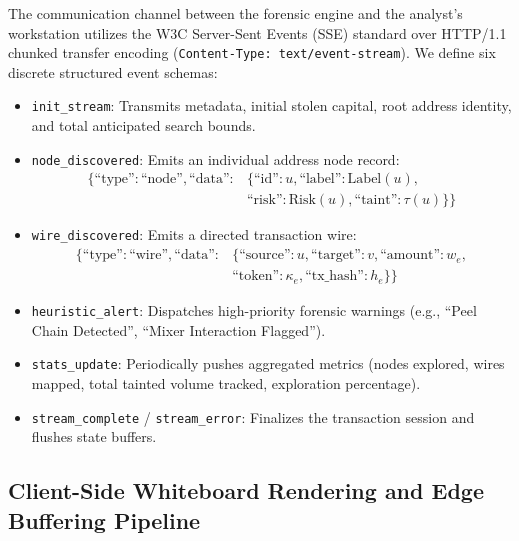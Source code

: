 The communication channel between the forensic engine and the analyst's workstation utilizes the W3C Server-Sent Events (SSE) standard over HTTP/1.1 chunked transfer encoding (\texttt{Content-Type: text/event-stream}). We define six discrete structured event schemas:

\begin{itemize}
    \item \texttt{init\_stream}: Transmits metadata, initial stolen capital, root address identity, and total anticipated search bounds.
    \item \texttt{node\_discovered}: Emits an individual address node record:
    \begin{equation}
    \begin{split}
        \{\text{``type''}: \text{``node''}, \text{``data''}: &\{\text{``id''}: u, \text{``label''}: \text{Label}(u), \\
        &\text{``risk''}: \text{Risk}(u), \text{``taint''}: \tau(u)\}\}
    \end{split}
    \end{equation}
    \item \texttt{wire\_discovered}: Emits a directed transaction wire:
    \begin{equation}
    \begin{split}
        \{\text{``type''}: \text{``wire''}, \text{``data''}: &\{\text{``source''}: u, \text{``target''}: v, \text{``amount''}: w_e, \\
        &\text{``token''}: \kappa_e, \text{``tx\_hash''}: h_e\}\}
    \end{split}
    \end{equation}
    \item \texttt{heuristic\_alert}: Dispatches high-priority forensic warnings (e.g., ``Peel Chain Detected'', ``Mixer Interaction Flagged'').
    \item \texttt{stats\_update}: Periodically pushes aggregated metrics (nodes explored, wires mapped, total tainted volume tracked, exploration percentage).
    \item \texttt{stream\_complete} / \texttt{stream\_error}: Finalizes the transaction session and flushes state buffers.
\end{itemize}

\subsection{Client-Side Whiteboard Rendering and Edge Buffering Pipeline}

